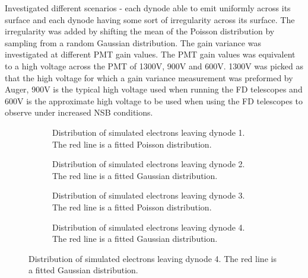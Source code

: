 Investigated different scenarios - each dynode able to emit uniformly across its surface and each dynode having some sort of irregularity across its surface. The irregularity was added by shifting the mean of the Poisson distribution by sampling from a random Gaussian distribution. The gain variance was investigated at different PMT gain values. The PMT gain values was equivalent to a high voltage across the PMT of 1300V, 900V and 600V. 1300V was picked as that the high voltage for which a gain variance measurement was preformed by Auger, 900V is the typical high voltage used when running the FD telescopes and 600V is the approximate high voltage to be used when using the FD telescopes to observe under increased NSB conditions. 

\begin{figure}
\centering
\begin{subfigure}[b]{0.44\textwidth}
\caption{Distribution of simulated electrons leaving dynode 1. The red line is a fitted Poisson distribution.}
\end{subfigure}
\hspace{3mm}
\begin{subfigure}[b]{0.44\textwidth}
\caption{Distribution of simulated electrons leaving dynode 2. The red line is a fitted Gaussian distribution.}
\end{subfigure}

\vspace{3mm}

\begin{subfigure}[b]{0.44\textwidth}
\caption{Distribution of simulated electrons leaving dynode 3. The red line is a fitted Poisson distribution.}
\end{subfigure}
\hspace{3mm}
\begin{subfigure}[b]{0.44\textwidth}
\caption{Distribution of simulated electrons leaving dynode 4. The red line is a fitted Gaussian distribution.}
\end{subfigure}


\end{figure}
